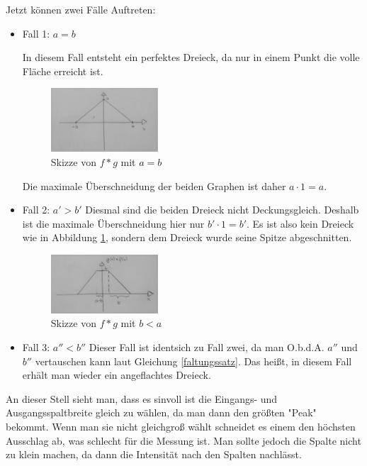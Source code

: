 Jetzt können zwei Fälle Auftreten:\\
 \begin{itemize}
    \item Fall 1: $a=b$
 
            In diesem Fall entsteht ein perfektes Dreieck, da nur in einem Punkt die volle Fläche erreicht ist.
            \begin{figure}[h]
                \centering
                \includegraphics[width = 4cm]{Bilder/FzV/frage6_3.jpg}
                \caption{Skizze von $f \ast g$ mit $a=b$}
                \label{faltung}
            \end{figure}
        Die maximale Überschneidung der beiden Graphen ist daher $a \cdot 1 = a$.
    \item Fall 2: $a'  > b'$
        Diesmal sind die beiden Dreieck nicht Deckungsgleich. Deshalb ist die maximale Überschneidung hier nur $b' \cdot 1 = b'$. 
        Es ist also kein Dreieck wie in Abbildung \ref{faltung}, sondern dem Dreieck wurde seine Spitze abgeschnitten. 
        \newpage
        \begin{figure}[h]
            \centering
            \includegraphics[width = 4cm]{Bilder/FzV/frage6_4.jpg}
            \caption{Skizze von $f\ast g$ mit $b < a$}
        \end{figure}
    \item Fall 3: $a''< b''$
        Dieser Fall ist identsich zu Fall zwei, da man O.b.d.A. $a''$ und $b''$ vertauschen kann laut Gleichung \ref{faltungssatz}.
        Das heißt, in diesem Fall erhält man wieder ein angeflachtes Dreieck.
   \end{itemize}
An dieser Stell sieht man, dass es sinvoll ist die Eingangs- und Ausgangsspaltbreite gleich zu wählen, da man dann den größten "Peak" bekommt. 
Wenn man sie nicht gleichgroß wählt schneidet es einem den höchsten Ausschlag ab, was schlecht für die Messung ist. Man sollte jedoch die Spalte nicht zu klein machen, da dann die Intensität nach den Spalten nachlässt. 

